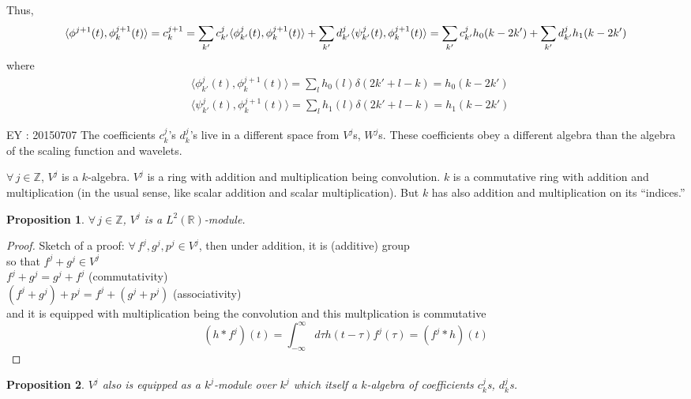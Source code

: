 \documentclass[twoside]{amsart}
\theoremstyle{plain}
\newtheorem{proposition}{Proposition}
\theoremstyle{definition}
\theoremstyle{remark}
\numberwithin{equation}{section}
\begin{document}
Thus,
\begin{equation}\label{Eq:c^{j+1}_k00}
\begin{gathered}
  \langle \phi^{j+1}(t), \phi^{j+1}_k(t) \rangle = c_k^{j+1} = \sum_{k'}c_{k'}^j \langle \phi^j_{k'}(t) , \phi^{j+1}_k(t) \rangle + \sum_{k'} d^j_{k'} \langle \psi_{k'}^j(t), \phi^{j+1}_k(t) \rangle = \sum_{k'} c_{k'}^j h_0(k-2k') + \sum_{k'} d_{k'}^jh_1(k-2k')
\end{gathered}
\end{equation}
where 
\[
\begin{aligned}
  & \langle \phi^j_{k'}(t), \phi_k^{j+1}(t) \rangle = \sum_l h_0(l) \delta(2k' + l-k) = h_0(k-2k') \\ 
  & \langle \psi^j_{k'}(t), \phi^{j+1}_k(t) \rangle =\sum_l h_1(l) \delta(2k'+l -k) = h_1(k-2k')
\end{aligned}
\]

EY : 20150707 The coefficients $c_k^j$'s $d_k^j$'s live in a different space from $V^j$s, $W^j$s.  These coefficients obey a different algebra than the algebra of the scaling function and wavelets.  

$\forall \, j \in \mathbb{Z}$, $V^j$ is a $k$-algebra.  $V^j$ is a ring with addition and multiplication being convolution.  $k$ is a commutative ring with addition and multiplication (in the usual sense, like scalar addition and scalar multiplication).  But $k$ has also addition and multiplication on its ``indices.''  

\begin{proposition}
$\forall \, j \in \mathbb{Z}$, $V^j$ is a $L^2(\mathbb{R})$-module.  
\end{proposition}

\begin{proof}
  Sketch of a proof: $\forall \, f^j, g^j, p^j \in V^j$, then under addition, it is (additive) group \\ so that $f^j + g^j \in V^j$ \\
$f^j + g^j = g^j + f^j$ (commutativity) \\
$(f^j + g^j) + p^j = f^j + (g^j + p^j)$ (associativity) \\

and it is equipped with multiplication being the convolution and this multplication is commutative
\[
(h*f^j)(t) = \int_{-\infty}^{\infty} d\tau h(t-\tau)f^j(\tau) = (f^j*h)(t)
\]

\end{proof}

\begin{proposition}
$V^j$ also is equipped as a $k^j$-module over $k^j$ which itself a $k$-algebra of coefficients $c^j_k$s, $d^j_k$s.  
\end{proposition}
\end{document}
